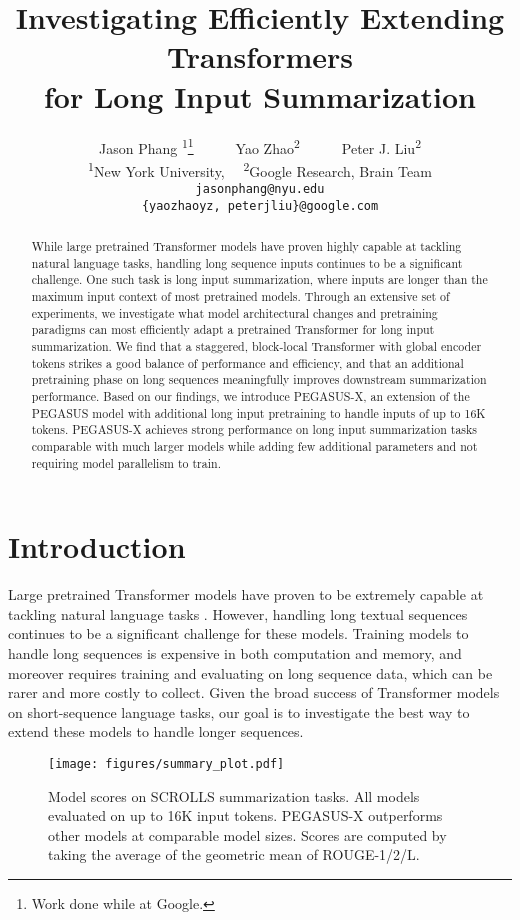 \documentclass[11pt]{article}
\title{Investigating Efficiently Extending Transformers \\ for Long Input Summarization}
\author{
Jason Phang \textsuperscript{1}\thanks{\hspace{2mm}Work done while at Google.}~~~~~~Yao Zhao\textsuperscript{2}~~~~~~Peter J. Liu\textsuperscript{2}\\
\textsuperscript{1}New York University,~~
\textsuperscript{2}Google Research, Brain Team\\
{\tt jasonphang@nyu.edu} \\
{\tt \{yaozhaoyz, peterjliu\}@google.com}\\
}
\newcommand{\largemodel}{PEGASUS-X}
\begin{document}
\maketitle
\begin{abstract}
While large pretrained Transformer models have proven highly capable at tackling natural language tasks, handling long sequence inputs continues to be a significant challenge.
One such task is long input summarization, where inputs are longer than the maximum input context of most pretrained models.
Through an extensive set of experiments, we investigate what model architectural changes and pretraining paradigms can most efficiently adapt a pretrained Transformer for long input summarization.
We find that a staggered, block-local Transformer with global encoder tokens strikes a good balance of performance and efficiency, and that an additional pretraining phase on long sequences meaningfully improves downstream summarization performance.
Based on our findings, we introduce \largemodel{}, an extension of the PEGASUS model with additional long input pretraining to handle inputs of up to 16K tokens.
\largemodel{} achieves strong performance on long input summarization tasks comparable with much larger models
while adding few additional parameters and not requiring model parallelism to train.
\end{abstract}



\section{Introduction}

Large pretrained Transformer models have proven to be extremely capable at tackling natural language tasks \citep{devlin2018bert,brown2020gpt3}. However, handling long textual sequences continues to be a significant challenge for these models.
Training models to handle long sequences is expensive in both computation and memory, and moreover requires training and evaluating on long sequence data, which can be rarer and more costly to collect.
Given the broad success of Transformer models on short-sequence language tasks, our goal is to investigate the best way to extend these models to handle longer sequences.

\begin{figure}
  \centering
  \texttt{[image: figures/summary\_plot.pdf]}
  \caption{
    Model scores on SCROLLS \citep{shaham2022scrolls} summarization tasks.
    All models evaluated on up to 16K input tokens.
    PEGASUS-X outperforms other models at comparable model sizes.
    Scores are computed by taking the average of the geometric mean of ROUGE-1/2/L.
  }
\label{fig:summary_plot}
\end{figure}
\end{document}
